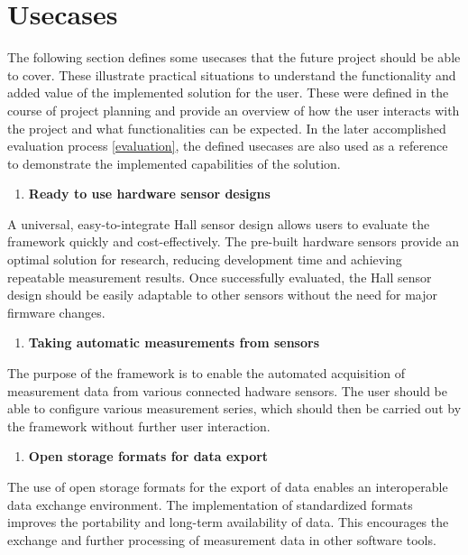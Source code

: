 \hypertarget{usecases}{%
\chapter{Usecases}\label{usecases}}

The following section defines some usecases that the future project
should be able to cover. These illustrate practical situations to
understand the functionality and added value of the implemented solution
for the user. These were defined in the course of project planning and
provide an overview of how the user interacts with the project and what
functionalities can be expected. In the later accomplished evaluation
process \ref{evaluation}, the defined usecases are also used as a
reference to demonstrate the implemented capabilities of the solution.

\begin{enumerate}
\def\labelenumi{\arabic{enumi}.}
\tightlist
\item
  \textbf{Ready to use hardware sensor designs}
\end{enumerate}

A universal, easy-to-integrate Hall sensor design allows users to
evaluate the framework quickly and cost-effectively. The pre-built
hardware sensors provide an optimal solution for research, reducing
development time and achieving repeatable measurement results. Once
successfully evaluated, the Hall sensor design should be easily
adaptable to other sensors without the need for major firmware changes.

\begin{enumerate}
\def\labelenumi{\arabic{enumi}.}
\setcounter{enumi}{1}
\tightlist
\item
  \textbf{Taking automatic measurements from sensors}
\end{enumerate}

The purpose of the framework is to enable the automated acquisition of
measurement data from various connected hadware sensors. The user should
be able to configure various measurement series, which should then be
carried out by the framework without further user interaction.

\begin{enumerate}
\def\labelenumi{\arabic{enumi}.}
\setcounter{enumi}{2}
\tightlist
\item
  \textbf{Open storage formats for data export}
\end{enumerate}

The use of open storage formats for the export of data enables an
interoperable data exchange environment. The implementation of
standardized formats improves the portability and long-term availability
of data. This encourages the exchange and further processing of
measurement data in other software tools.

